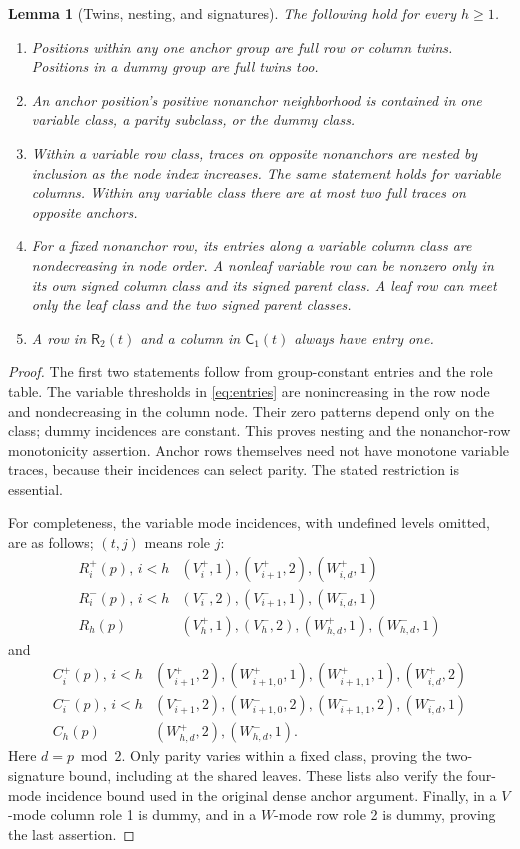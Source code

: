 \documentclass[11pt,a4paper]{article}
\newtheorem{lemma}[theorem]{Lemma}
\theoremstyle{remark}
\newcommand{\Rrole}{\mathsf R}
\newcommand{\Crole}{\mathsf C}
\begin{document}
\begin{lemma}[Twins, nesting, and signatures]\label{lem:structure}
The following hold for every \(h\ge1\).
\begin{enumerate}
\item Positions within any one anchor group are full row or column
twins. Positions in a dummy group are full twins too.
\item An anchor position's positive nonanchor neighborhood is contained
in one variable class, a parity subclass, or the dummy class.
\item Within a variable row class, traces on opposite nonanchors are
nested by inclusion as the node index increases. The same statement
holds for variable columns. Within any variable class there are at
most two full traces on opposite anchors.
\item For a fixed \emph{nonanchor} row, its entries along a variable
column class are nondecreasing in node order. A nonleaf variable row
can be nonzero only in its own signed column class and its signed
parent class. A leaf row can meet only the leaf class and the two
signed parent classes.
\item A row in \(\Rrole_2(t)\) and a column in \(\Crole_1(t)\) always
have entry one.
\end{enumerate}
\end{lemma}
\begin{proof}
The first two statements follow from group-constant entries and the role
table. The variable thresholds in \eqref{eq:entries} are nonincreasing
in the row node and nondecreasing in the column node. Their zero
patterns depend only on the class; dummy incidences are constant.
This proves nesting and the nonanchor-row monotonicity assertion.
Anchor rows themselves need not have monotone variable traces, because
their incidences can select parity. The stated restriction is essential.

For completeness, the variable mode incidences, with undefined levels
omitted, are as follows; \((t,j)\) means role \(j\):
\[
\begin{array}{c|l}
R_i^+(p),\,i<h&(V_i^+,1),(V_{i+1}^+,2),(W_{i,d}^+,1)\\
R_i^-(p),\,i<h&(V_i^-,2),(V_{i+1}^-,1),(W_{i,d}^-,1)\\
R_h(p)&(V_h^+,1),(V_h^-,2),(W_{h,d}^+,1),(W_{h,d}^-,1)
\end{array}
\]
and
\[
\begin{array}{c|l}
C_i^+(p),\,i<h&(V_{i+1}^+,2),(W_{i+1,0}^+,1),
 (W_{i+1,1}^+,1),(W_{i,d}^+,2)\\
C_i^-(p),\,i<h&(V_{i+1}^-,2),(W_{i+1,0}^-,2),
 (W_{i+1,1}^-,2),(W_{i,d}^-,1)\\
C_h(p)&(W_{h,d}^+,2),(W_{h,d}^-,1).
\end{array}
\]
Here \(d=p\bmod2\). Only parity varies within a fixed class, proving
the two-signature bound, including at the shared leaves. These lists
also verify the four-mode incidence bound used in the original dense
anchor argument. Finally, in a \(V\)-mode column role 1 is dummy, and
in a \(W\)-mode row role 2 is dummy, proving the last assertion.
\end{proof}
\end{document}
